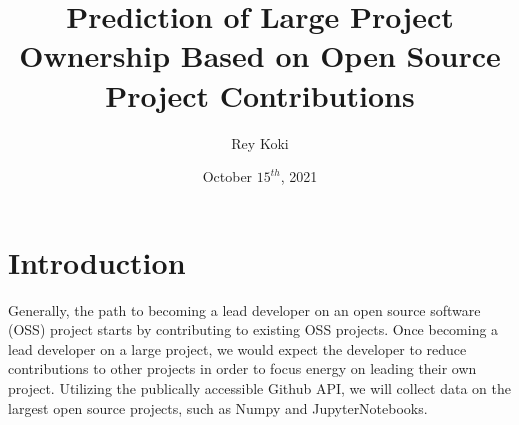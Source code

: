 \documentclass[12pt,a4paper]{article}
\title{Prediction of Large Project Ownership Based on Open Source Project Contributions}
\author{Rey Koki}
\date{October $15^{th}$, 2021}
\begin{document}
\maketitle

\section*{Introduction}
Generally, the path to becoming a lead developer on an open source software (OSS) project starts by contributing to existing OSS projects. Once becoming a lead developer on a large project, we would expect the developer to reduce contributions to other projects in order to focus energy on leading their own project. Utilizing the publically accessible Github API, we will collect data on the largest open source projects, such as Numpy and JupyterNotebooks. 
\end{document}
